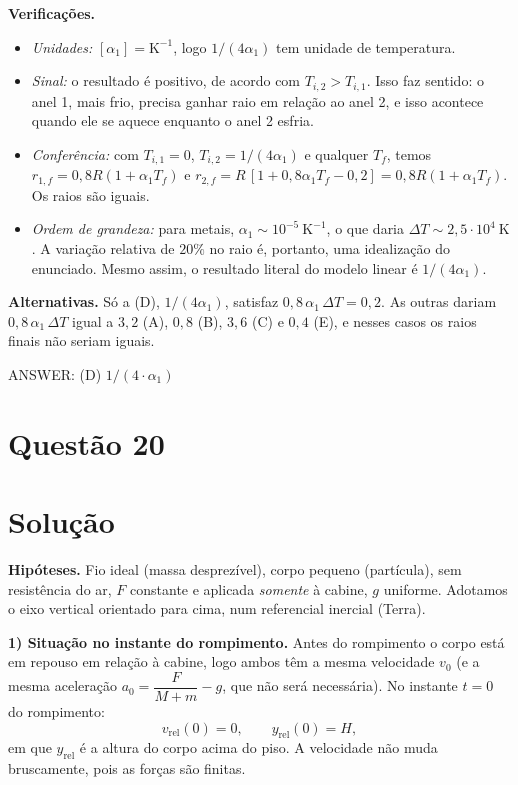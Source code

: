 \documentclass{article}%
\begin{document}
\textbf{Verificações.}
\begin{itemize}
\item \emph{Unidades:} $[\alpha_1]=\mathrm{K^{-1}}$, logo $1/(4\alpha_1)$ tem unidade de temperatura.
\item \emph{Sinal:} o resultado é positivo, de acordo com $T_{i,2}>T_{i,1}$. Isso faz sentido: o anel 1, mais frio, precisa ganhar raio em relação ao anel 2, e isso acontece quando ele se aquece enquanto o anel 2 esfria.
\item \emph{Conferência:} com $T_{i,1}=0$, $T_{i,2}=1/(4\alpha_1)$ e qualquer $T_f$, temos $r_{1,f}=0{,}8R(1+\alpha_1T_f)$ e $r_{2,f}=R\,[1+0{,}8\alpha_1T_f-0{,}2]=0{,}8R(1+\alpha_1T_f)$. Os raios são iguais.
\item \emph{Ordem de grandeza:} para metais, $\alpha_1\sim10^{-5}\ \mathrm{K^{-1}}$, o que daria $\Delta T\sim2{,}5\cdot10^{4}\ \mathrm{K}$. A variação relativa de $20\%$ no raio é, portanto, uma idealização do enunciado. Mesmo assim, o resultado literal do modelo linear é $1/(4\alpha_1)$.
\end{itemize}

\textbf{Alternativas.} Só a (D), $1/(4\alpha_1)$, satisfaz $0{,}8\,\alpha_1\,\Delta T=0{,}2$. As outras dariam $0{,}8\,\alpha_1\,\Delta T$ igual a $3{,}2$ (A), $0{,}8$ (B), $3{,}6$ (C) e $0{,}4$ (E), e nesses casos os raios finais não seriam iguais.

ANSWER: (D) $1/(4\cdot\alpha_1)$%
\newpage%
\section*{Questão 20}

\section*{Solução}

\textbf{Hipóteses.} Fio ideal (massa desprezível), corpo pequeno (partícula), sem resistência do ar, $F$ constante e aplicada \emph{somente} à cabine, $g$ uniforme. Adotamos o eixo vertical orientado para cima, num referencial inercial (Terra).

\textbf{1) Situação no instante do rompimento.} Antes do rompimento o corpo está em repouso em relação à cabine, logo ambos têm a mesma velocidade $v_0$ (e a mesma aceleração $a_0=\dfrac{F}{M+m}-g$, que não será necessária). No instante $t=0$ do rompimento:
\[
v_{\text{rel}}(0)=0, \qquad y_{\text{rel}}(0)=H,
\]
em que $y_{\text{rel}}$ é a altura do corpo acima do piso. A velocidade não muda bruscamente, pois as forças são finitas.
\end{document}
